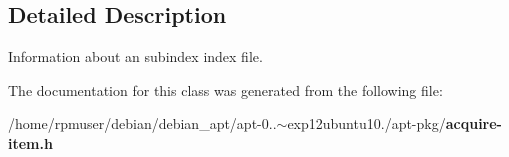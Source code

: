 \subsection{\-Detailed \-Description}
\-Information about an subindex index file. 

\-The documentation for this class was generated from the following file\-:\begin{DoxyCompactItemize}
\item 
/home/rpmuser/debian/debian\-\_\-apt/apt-\/0..$\sim$exp12ubuntu10./apt-\/pkg/{\bf acquire-\/item.\-h}\end{DoxyCompactItemize}
